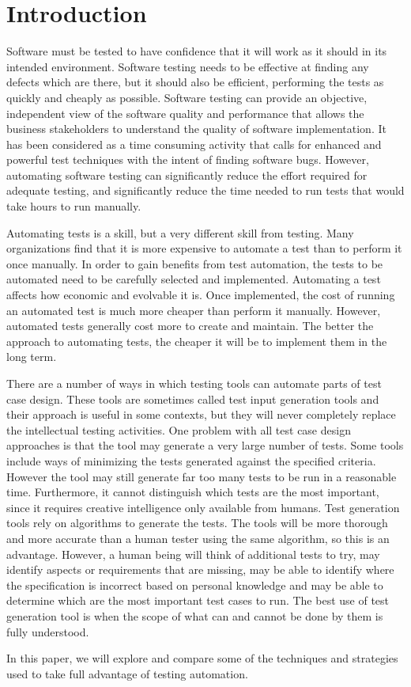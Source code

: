 \section{Introduction}

Software must be tested to have confidence that it will work as it should in
its intended environment. Software testing needs to be effective at finding
any defects which are there, but it should also be efficient, performing the
tests as quickly and cheaply as possible. Software testing can provide an
objective, independent view of the software quality and performance that allows
the business stakeholders to understand the quality of software implementation.
It has been considered as a time consuming activity that calls for enhanced and
powerful test techniques with the intent of finding software bugs. However, automating
software testing can significantly reduce the effort required for adequate
testing, and significantly reduce the time needed to run tests that would take
hours to run manually.

Automating tests is a skill, but a very different skill from testing. Many
organizations find that it is more expensive to automate a test than to perform
it once manually. In order to gain benefits from test automation, the tests to
be automated need to be carefully selected and implemented. Automating a test
affects how economic and evolvable it is. Once implemented, the cost of running
an automated test is much more cheaper than perform it manually. However,
automated tests generally cost more to create and maintain. The better the
approach to automating tests, the cheaper it will be to implement them in the
long term.

There are a number of ways in which testing tools can automate parts of test
case design. These tools are sometimes called test input generation tools and
their approach is useful in some contexts, but they will never completely
replace the intellectual testing activities. One problem with all test case
design approaches is that the tool may generate a very large number of tests.
Some tools include ways of minimizing the tests generated against the specified
criteria. However the tool may still generate far too many tests to be run in a
reasonable time. Furthermore, it cannot distinguish which tests are the most important,
since it requires creative intelligence only available from humans. Test
generation tools rely on algorithms to generate the tests. The tools will be
more thorough and more accurate than a human tester using the same algorithm,
so this is an advantage. However, a human being will think of additional tests
to try, may identify aspects or requirements that are missing, may be able to
identify where the specification is incorrect based on personal knowledge and
may be able to determine which are the most important test cases to run. The
best use of test generation tool is when the scope of what can and cannot be
done by them is fully understood.

In this paper, we will explore and compare some of the techniques and strategies
used to take full advantage of testing automation.